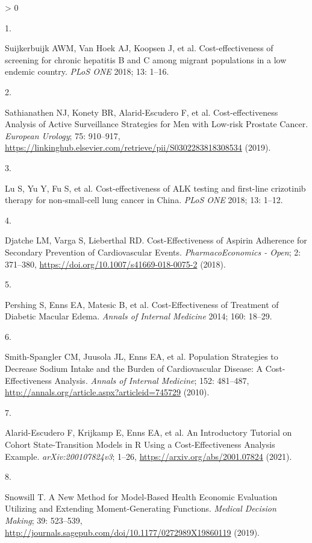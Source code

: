 \documentclass[
]{article}
\newlength{\cslhangindent}
\newlength{\csllabelwidth}
\newenvironment{CSLReferences}[2] %
 {%
  \setlength{\parindent}{0pt}
  \ifodd #1 \everypar{\setlength{\hangindent}{\cslhangindent}}\ignorespaces\fi
  \ifnum #2 > 0
  \setlength{\parskip}{#2\baselineskip}
  \fi
 }%
 {}
\newcommand{\CSLLeftMargin}[1]{\parbox[t]{\csllabelwidth}{#1}}
\newcommand{\CSLRightInline}[1]{\parbox[t]{\linewidth - \csllabelwidth}{#1}\break}
\begin{document}
\hypertarget{refs}{}
\begin{CSLReferences}{0}{0}
\leavevmode\hypertarget{ref-Suijkerbuijk2018}{}%
\CSLLeftMargin{1. }
\CSLRightInline{Suijkerbuijk AWM, Van Hoek AJ, Koopsen J, et al. {Cost-effectiveness of screening for chronic hepatitis B and C among migrant populations in a low endemic country}. \emph{PLoS ONE} 2018; 13: 1--16.}

\leavevmode\hypertarget{ref-Sathianathen2018a}{}%
\CSLLeftMargin{2. }
\CSLRightInline{Sathianathen NJ, Konety BR, Alarid-Escudero F, et al. {Cost-effectiveness Analysis of Active Surveillance Strategies for Men with Low-risk Prostate Cancer}. \emph{European Urology}; 75: 910--917, \url{https://linkinghub.elsevier.com/retrieve/pii/S0302283818308534} (2019).}

\leavevmode\hypertarget{ref-Lu2018b}{}%
\CSLLeftMargin{3. }
\CSLRightInline{Lu S, Yu Y, Fu S, et al. {Cost-effectiveness of ALK testing and first-line crizotinib therapy for non-small-cell lung cancer in China}. \emph{PLoS ONE} 2018; 13: 1--12.}

\leavevmode\hypertarget{ref-Djatche2018}{}%
\CSLLeftMargin{4. }
\CSLRightInline{Djatche LM, Varga S, Lieberthal RD. {Cost-Effectiveness of Aspirin Adherence for Secondary Prevention of Cardiovascular Events}. \emph{PharmacoEconomics - Open}; 2: 371--380, \url{https://doi.org/10.1007/s41669-018-0075-2} (2018).}

\leavevmode\hypertarget{ref-Pershing2014}{}%
\CSLLeftMargin{5. }
\CSLRightInline{Pershing S, Enns EA, Matesic B, et al. {Cost-Effectiveness of Treatment of Diabetic Macular Edema}. \emph{Annals of Internal Medicine} 2014; 160: 18--29.}

\leavevmode\hypertarget{ref-Smith-Spangler2010}{}%
\CSLLeftMargin{6. }
\CSLRightInline{Smith-Spangler CM, Juusola JL, Enns EA, et al. {Population Strategies to Decrease Sodium Intake and the Burden of Cardiovascular Disease: A Cost-Effectiveness Analysis}. \emph{Annals of Internal Medicine}; 152: 481--487, \url{http://annals.org/article.aspx?articleid=745729} (2010).}

\leavevmode\hypertarget{ref-Alarid-Escudero2021a}{}%
\CSLLeftMargin{7. }
\CSLRightInline{Alarid-Escudero F, Krijkamp E, Enns EA, et al. {An Introductory Tutorial on Cohort State-Transition Models in R Using a Cost-Effectiveness Analysis Example}. \emph{arXiv:200107824v3}; 1--26, \url{https://arxiv.org/abs/2001.07824} (2021).}

\leavevmode\hypertarget{ref-Snowsill2019}{}%
\CSLLeftMargin{8. }
\CSLRightInline{Snowsill T. {A New Method for Model-Based Health Economic Evaluation Utilizing and Extending Moment-Generating Functions}. \emph{Medical Decision Making}; 39: 523--539, \url{http://journals.sagepub.com/doi/10.1177/0272989X19860119} (2019).}


\end{CSLReferences}
\end{document}
